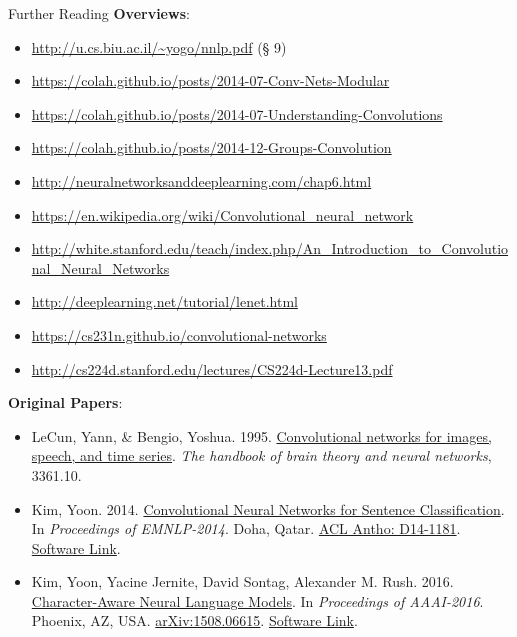 \documentclass[xcolor=pdftex,x11names,table,hyperref]{beamer}
\newcommand{\Conv}{Convolutional}
\begin{document}


\begin{frame}{Further Reading}
\textbf{Overviews}:
\begin{tiny}
\begin{itemize}
	\item \url{http://u.cs.biu.ac.il/~yogo/nnlp.pdf} (\S{} 9)
	\item \url{https://colah.github.io/posts/2014-07-Conv-Nets-Modular}
	\item \url{https://colah.github.io/posts/2014-07-Understanding-Convolutions}
	\item \url{https://colah.github.io/posts/2014-12-Groups-Convolution}
	\item \url{http://neuralnetworksanddeeplearning.com/chap6.html}
	\item \url{https://en.wikipedia.org/wiki/Convolutional_neural_network}
	\item \url{http://white.stanford.edu/teach/index.php/An_Introduction_to_Convolutional_Neural_Networks}
	\item \url{http://deeplearning.net/tutorial/lenet.html}
	\item \url{https://cs231n.github.io/convolutional-networks}
	\item \url{http://cs224d.stanford.edu/lectures/CS224d-Lecture13.pdf}
\end{itemize}
\end{tiny}
\textbf{Original Papers}:
\begin{tiny}
\begin{itemize}
	\item LeCun, Yann, \& Bengio, Yoshua. 1995. \href{http://www.iro.umontreal.ca/~lisa/pointeurs/handbook-convo.pdf}{\Conv{} networks for images, speech, and time series}. \textit{The handbook of brain theory and neural networks}, 3361.10.
	\item Kim, Yoon. 2014. \href{https://www.aclweb.org/anthology/D14-1181.pdf}{Convolutional Neural Networks for Sentence Classification}.  In \textit{Proceedings of EMNLP-2014}. Doha, Qatar. \href{https://www.aclweb.org/anthology/D14-1181.pdf}{ACL Antho: D14-1181}. \href{https://github.com/yoonkim/CNN_sentence}{Software Link}.
	\item Kim, Yoon, Yacine Jernite, David Sontag, Alexander M. Rush. 2016. \href{http://arxiv.org/abs/1508.06615}{Character-Aware Neural Language Models}.  In \textit{Proceedings of AAAI-2016}. Phoenix, AZ, USA. \href{http://arxiv.org/abs/1508.06615}{arXiv:1508.06615}. \href{https://github.com/yoonkim/lstm-char-cnn}{Software Link}.
\end{itemize}
\end{tiny}
\end{frame}





\end{document}
